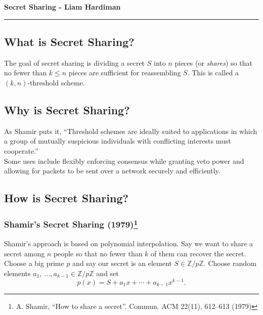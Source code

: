 \documentclass[11pt]{article}
\newcommand{\integers}{\mathbb{Z}}
\begin{document}
\begin{center}
{\bf \Large Secret Sharing - Liam Hardiman}
\vspace{0.2cm}
\hrule
\end{center}

\subsection*{What is Secret Sharing?}
The goal of secret sharing is dividing a secret $S$ into $n$ pieces (or \textit{shares}) so that no fewer than $k\leq n$ pieces are sufficient for reassembling $S$. This is called a $(k,n)$-threshold scheme.

\subsection*{Why is Secret Sharing?}
As Shamir puts it, ``Threshold schemes are ideally suited to applications in which a group of mutually suspicious individuals with conflicting interests must cooperate.''\\

\noindent Some uses include flexibly enforcing consensus while granting veto power and allowing for packets to be sent over a network securely and efficiently.


\subsection*{How is Secret Sharing?}
\subsubsection*{Shamir's Secret Sharing (1979)\footnote{A. Shamir, ``How to share a secret''. Commun. ACM 22(11), 612–613 (1979)}}
Shamir's approach is based on polynomial interpolation. Say we want to share a secret among $n$ people so that no fewer than $k$ of them can recover the secret. Choose a big prime $p$ and say our secret is an element $S\in \integers/p\integers$. Choose random elements $a_1,\ \ldots, a_{k-1}\in \integers/p\integers$ and set
\[
p(x) = S + a_1x + \cdots + a_{k-1}x^{k-1}.
\]
\end{document}
